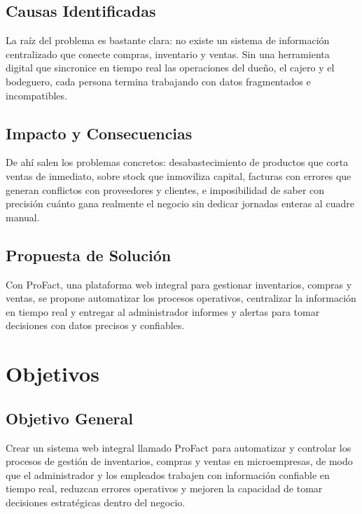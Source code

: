 \documentclass[12pt, letterpaper]{report}
\begin{document}
\section{Causas Identificadas}

La raíz del problema es bastante clara: no existe un sistema de información centralizado que conecte compras, inventario y ventas. Sin una herramienta digital que sincronice en tiempo real las operaciones del dueño, el cajero y el bodeguero, cada persona termina trabajando con datos fragmentados e incompatibles.

\section{Impacto y Consecuencias}

De ahí salen los problemas concretos: desabastecimiento de productos que corta ventas de inmediato, sobre stock que inmoviliza capital, facturas con errores que generan conflictos con proveedores y clientes, e imposibilidad de saber con precisión cuánto gana realmente el negocio sin dedicar jornadas enteras al cuadre manual.

\section{Propuesta de Solución}

Con ProFact, una plataforma web integral para gestionar inventarios, compras y ventas, se propone automatizar los procesos operativos, centralizar la información en tiempo real y entregar al administrador informes y alertas para tomar decisiones con datos precisos y confiables.


\chapter{Objetivos}

\section{Objetivo General}

Crear un sistema web integral llamado ProFact para automatizar y controlar los procesos de gestión de inventarios, compras y ventas en microempresas, de modo que el administrador y los empleados trabajen con información confiable en tiempo real, reduzcan errores operativos y mejoren la capacidad de tomar decisiones estratégicas dentro del negocio.
\end{document}

